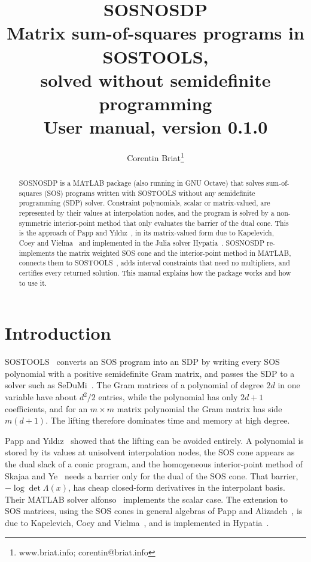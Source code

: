\documentclass[11pt,a4paper]{article}
\title{\textbf{SOSNOSDP}\\[4pt]\large Matrix sum-of-squares programs in SOSTOOLS,\\ solved without semidefinite programming\\[8pt]\normalsize User manual, version 0.1.0}
\author{Corentin Briat\thanks{www.briat.info; corentin@briat.info}}
\date{}
\begin{document}
\maketitle

\begin{abstract}
\noindent SOSNOSDP is a MATLAB package (also running in GNU Octave) that solves sum-of-squares (SOS) programs written with SOSTOOLS without any semidefinite programming (SDP) solver. Constraint polynomials, scalar or matrix-valued, are represented by their values at interpolation nodes, and the program is solved by a non-symmetric interior-point method that only evaluates the barrier of the dual cone. This is the approach of Papp and Y{\i}ld{\i}z~\cite{PappYildiz2019}, in its matrix-valued form due to Kapelevich, Coey and Vielma~\cite{KCV2023} and implemented in the Julia solver Hypatia~\cite{CKV2022}. SOSNOSDP re-implements the matrix weighted SOS cone and the interior-point method in MATLAB, connects them to SOSTOOLS~\cite{SOSTOOLS}, adds interval constraints that need no multipliers, and certifies every returned solution. This manual explains how the package works and how to use it.
\end{abstract}

\tableofcontents

\section{Introduction}\label{sec:intro}
SOSTOOLS~\cite{SOSTOOLS} converts an SOS program into an SDP by writing every SOS polynomial with a positive semidefinite Gram matrix, and passes the SDP to a solver such as SeDuMi~\cite{Sturm1999}. The Gram matrices of a polynomial of degree $2d$ in one variable have about $d^2/2$ entries, while the polynomial has only $2d+1$ coefficients, and for an $m\times m$ matrix polynomial the Gram matrix has side $m(d+1)$. The lifting therefore dominates time and memory at high degree.

Papp and Y{\i}ld{\i}z~\cite{PappYildiz2019} showed that the lifting can be avoided entirely. A polynomial is stored by its values at unisolvent interpolation nodes, the SOS cone appears as the dual slack of a conic program, and the homogeneous interior-point method of Skajaa and Ye~\cite{SkajaaYe2015,PappYildiz2017} needs a barrier only for the dual of the SOS cone. That barrier, $-\log\det\Lambda(x)$, has cheap closed-form derivatives in the interpolant basis. Their MATLAB solver alfonso~\cite{alfonso} implements the scalar case. The extension to SOS matrices, using the SOS cones in general algebras of Papp and Alizadeh~\cite{PappAlizadeh2013}, is due to Kapelevich, Coey and Vielma~\cite{KCV2023}, and is implemented in Hypatia~\cite{CKV2022,CKV2023}.
\end{document}
